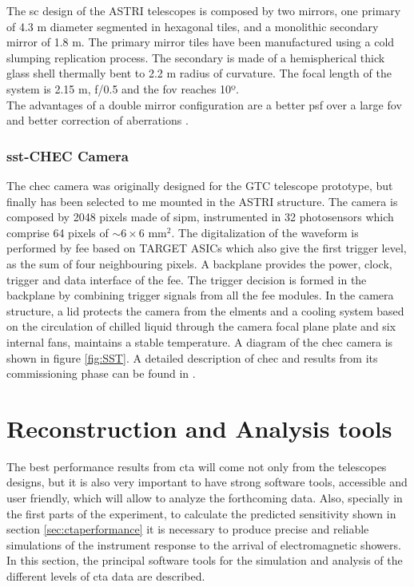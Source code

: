 \documentclass[main.tex]{subfiles}
\begin{document}
The \gls{sc} design of the ASTRI telescopes is composed by two mirrors, one primary of 4.3 m diameter segmented in hexagonal tiles, and a monolithic secondary mirror of 1.8 m. The primary mirror tiles have been manufactured using a cold slumping replication process. The secondary is made of a hemispherical thick glass shell thermally bent to 2.2 m radius of curvature. The focal length of the system is 2.15 m, f/0.5 and the \gls{fov} reaches 10º.\\
The advantages of a double mirror configuration are a better \gls{psf} over a large \gls{fov} and better correction of aberrations \cite{2017ASTRItels}.

\subsubsection{\gls{sst}-CHEC Camera}

The \gls{chec} camera was originally designed for the GTC telescope prototype, but finally has been selected to me mounted in the ASTRI structure. The camera is composed by 2048 pixels made of \gls{sipm}, instrumented in 32 photosensors which comprise 64 pixels of $\sim 6\times6$ mm$^2$. The digitalization of the waveform is performed by \gls{fee} based on TARGET ASICs \cite{2017TARGETASIC} which also give the first trigger level, as the sum of four neighbouring pixels. A backplane provides the power, clock, trigger and data interface of the \gls{fee}. The trigger decision is formed in the backplane by combining trigger signals from all the \gls{fee} modules. In the camera structure, a lid protects the camera from the elments and a cooling system based on the circulation of chilled liquid through the camera focal plane plate and six internal fans, maintains a stable temperature. A diagram of the \gls{chec} camera is shown in figure \ref{fig:SST}. A detailed description of \gls{chec} and results from its commissioning phase can be found in \cite{2017CHECcam}.

\section{Reconstruction and Analysis tools} \label{sec:ctaanalysis}

The best performance results from \gls{cta} will come not only from the telescopes designs, but it is also very important to have strong software tools, accessible and user friendly, which will allow to analyze the forthcoming data. Also, specially in the first parts of the experiment, to calculate the predicted sensitivity shown in section \ref{sec:ctaperformance} it is necessary to produce precise and reliable simulations of the instrument response to the arrival of electromagnetic showers. In this section, the principal software tools for the simulation and analysis of the different levels of \gls{cta} data are described. 
\end{document}
